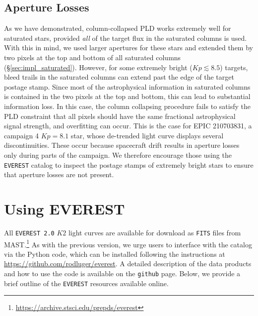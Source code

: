 \documentclass[]{emulateapj}
\newcommand{\Kp}{\ensuremath{Kp}}
\begin{document}
\subsection{Aperture Losses}
\label{sec:losses}
As we have demonstrated, column-collapsed PLD works extremely well for saturated stars,
provided \emph{all} of the target flux in the saturated columns is used. With this
in mind, we used larger apertures for these stars and
extended them by two pixels at the top and bottom of all saturated columns 
(\S\ref{sec:impl_saturated}). However, for some extremely bright ($\Kp \lesssim 8.5$) 
targets, bleed trails in the saturated columns can extend past the edge of the
target postage stamp. Since most of the astrophysical information in saturated columns
is contained in the two pixels at the top and bottom, this can lead to substantial
information loss. In this case, the column collapsing procedure fails to satisfy the
PLD constraint that all pixels should have the same fractional astrophysical signal
strength, and overfitting can occur. This is the case for EPIC 210703831, a campaign 4
$\Kp = 8.1$ star, whose de-trended light curve displays several discontinuities. These
occur because spacecraft drift results in aperture losses only during parts of the
campaign. We therefore encourage those using the \texttt{EVEREST} catalog to inspect
the postage stamps of extremely bright stars to ensure that aperture losses are not
present.
%

\section{Using EVEREST}
\label{sec:using}
All \texttt{EVEREST 2.0} $K2$ light curves are available for download as \texttt{FITS} files
from MAST.\footnote{\url{https://archive.stsci.edu/prepds/everest}} As with the 
previous version, we urge users to interface with the catalog via the Python code,
which can be installed following the instructions at 
\url{https://github.com/rodluger/everest}. A detailed description of the data products
and how to use the code is available on the \texttt{github} page. Below, we provide
a brief outline of the \texttt{EVEREST} resources available online.
\end{document}
